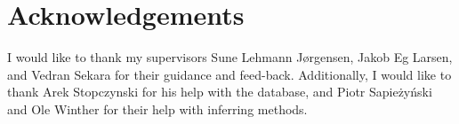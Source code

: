 \chapter{Acknowledgements}

I would like to thank my supervisors Sune Lehmann Jørgensen, Jakob Eg Larsen, and Vedran Sekara for their guidance and feed-back. Additionally, I would like to thank Arek Stopczynski for his help with the database, and Piotr Sapieżyński and Ole Winther for their help with inferring methods.

